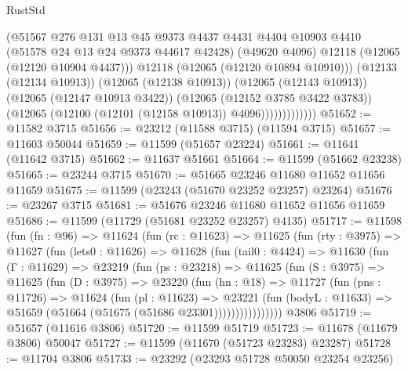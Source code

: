 \begin{lexlean}{RustStd}
\begin{coremodule}
                            (@51567
                              @276
                              @131
                              @13
                              @45
                              @9373
                              @4437
                              @4431
                              @4404
                              @10903
                              @4410
                              (@51578 @24 @13 @24 @9373 @44617 @42428)
                              (@49620 @4096)
                              @12118
                              (@12065 (@12120 @10904 @4437)))
                            @12118
                            (@12065 (@12120 @10894 @10910)))
                          (@12133 (@12134 @10913))
                          (@12065 (@12138 @10913))
                          (@12065 (@12143 @10913))
                          (@12065 (@12147 @10913 @3422))
                          (@12065 (@12152 @3785 @3422 @3783))
                          (@12065 (@12100 (@12101 (@12158 @10913)) @4096)))))))))))))
@51652 := @11582 @3715
@51656 := @23212 (@11588 @3715) (@11594 @3715)
@51657 := @11603 @50044
@51659 := @11599 (@51657 @23224)
@51661 := @11641 (@11642 @3715)
@51662 := @11637 @51661
@51664 := @11599 (@51662 @23238)
@51665 := @23244 @3715
@51670 := @51665 @23246 @11680 @11652 @11656 @11659
@51675 := @11599 (@23243 (@51670 @23252 @23257) @23264)
@51676 := @23267 @3715
@51681 := @51676 @23246 @11680 @11652 @11656 @11659
@51686 := @11599 (@11729 (@51681 @23252 @23257) @4135)
@51717 := @11598
    (fun (fn : @96) =>
    @11624
      (fun (rc : @11623) =>
      @11625
        (fun (rty : @3975) =>
        @11627
          (fun (lets0 : @11626) =>
          @11628
            (fun (tail0 : @4424) =>
            @11630
              (fun (Γ : @11629) =>
              @23219
                (fun (ps : @23218) =>
                @11625
                  (fun (S : @3975) =>
                  @11625
                    (fun (D : @3975) =>
                    @23220
                      (fun (hn : @18) =>
                      @11727
                        (fun (pns : @11726) =>
                        @11624
                          (fun (pl : @11623) =>
                          @23221
                            (fun (bodyL : @11633) =>
                            @51659 (@51664 (@51675 (@51686 @23301))))))))))))))))
    @3806
@51719 := @51657 (@11616 @3806)
@51720 := @11599 @51719
@51723 := @11678 (@11679 @3806) @50047
@51727 := @11599 (@11670 (@51723 @23283) @23287)
@51728 := @11704 @3806
@51733 := @23292 (@23293 @51728 @50050 @23254 @23256)

\end{coremodule}
\end{lexlean}
